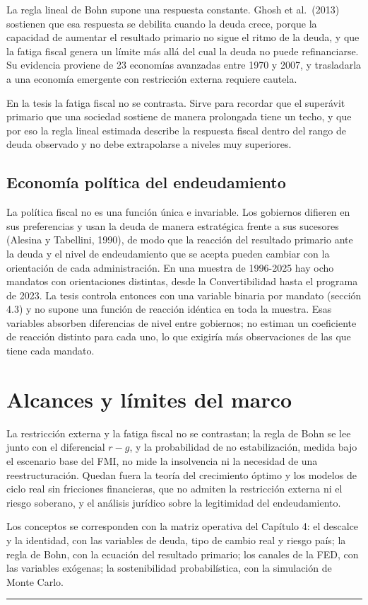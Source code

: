 La regla lineal de Bohn supone una respuesta constante. Ghosh et
al.~(2013) sostienen que esa respuesta se debilita cuando la deuda
crece, porque la capacidad de aumentar el resultado primario no sigue el
ritmo de la deuda, y que la fatiga fiscal genera un límite más allá del
cual la deuda no puede refinanciarse. Su evidencia proviene de 23
economías avanzadas entre 1970 y 2007, y trasladarla a una economía
emergente con restricción externa requiere cautela.

En la tesis la fatiga fiscal no se contrasta. Sirve para recordar que el
superávit primario que una sociedad sostiene de manera prolongada tiene
un techo, y que por eso la regla lineal estimada describe la respuesta
fiscal dentro del rango de deuda observado y no debe extrapolarse a
niveles muy superiores.

\subsection{Economía política del endeudamiento}

La política fiscal no es una función única e invariable. Los gobiernos
difieren en sus preferencias y usan la deuda de manera estratégica
frente a sus sucesores (Alesina y Tabellini, 1990), de modo que la
reacción del resultado primario ante la deuda y el nivel de
endeudamiento que se acepta pueden cambiar con la orientación de cada
administración. En una muestra de 1996-2025 hay ocho mandatos con
orientaciones distintas, desde la Convertibilidad hasta el programa de
2023. La tesis controla entonces con una variable binaria por mandato
(sección 4.3) y no supone una función de reacción idéntica en toda la
muestra. Esas variables absorben diferencias de nivel entre gobiernos;
no estiman un coeficiente de reacción distinto para cada uno, lo que
exigiría más observaciones de las que tiene cada mandato.

\section{Alcances y límites del marco}

La restricción externa y la fatiga fiscal no se contrastan; la regla de
Bohn se lee junto con el diferencial \(r-g\), y la probabilidad de no
estabilización, medida bajo el escenario base del FMI, no mide la
insolvencia ni la necesidad de una reestructuración. Quedan fuera la
teoría del crecimiento óptimo y los modelos de ciclo real sin fricciones
financieras, que no admiten la restricción externa ni el riesgo
soberano, y el análisis jurídico sobre la legitimidad del endeudamiento.

Los conceptos se corresponden con la matriz operativa del Capítulo 4: el
descalce y la identidad, con las variables de deuda, tipo de cambio real
y riesgo país; la regla de Bohn, con la ecuación del resultado primario;
los canales de la FED, con las variables exógenas; la sostenibilidad
probabilística, con la simulación de Monte Carlo.

\begin{center}\rule{0.5\linewidth}{0.5pt}\end{center}
